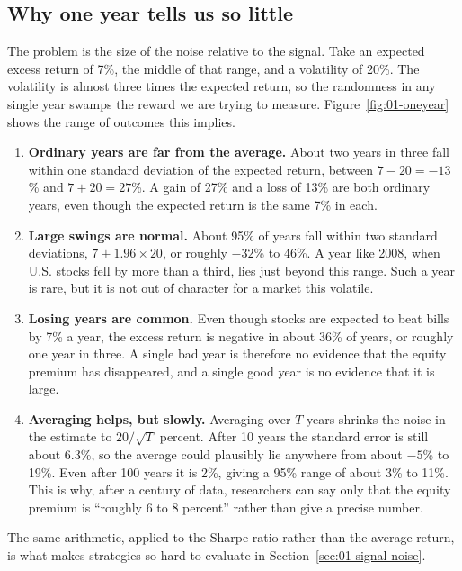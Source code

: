 \subsection{Why one year tells us so little}

The problem is the size of the noise relative to the signal. Take an expected excess return of 7\%, the middle of that range, and a volatility of 20\%. The volatility is almost three times the expected return, so the randomness in any single year swamps the reward we are trying to measure. Figure~\ref{fig:01-oneyear} shows the range of outcomes this implies.

\begin{enumerate}
  \item \textbf{Ordinary years are far from the average.} About two years in three fall within one standard deviation of the expected return, between $7 - 20 = -13$\% and $7 + 20 = 27$\%. A gain of 27\% and a loss of 13\% are both ordinary years, even though the expected return is the same 7\% in each.
  \item \textbf{Large swings are normal.} About 95\% of years fall within two standard deviations, $7 \pm 1.96 \times 20$, or roughly $-32$\% to 46\%. A year like 2008, when U.S. stocks fell by more than a third, lies just beyond this range. Such a year is rare, but it is not out of character for a market this volatile.
  \item \textbf{Losing years are common.} Even though stocks are expected to beat bills by 7\% a year, 
  the excess return is negative in about 36\% of years, or roughly one year in three. A single bad year is therefore no evidence that the equity premium has disappeared, and a single good year is no evidence that it is large.
  \item \textbf{Averaging helps, but slowly.} Averaging over $T$ years shrinks the noise in the estimate to $20/\sqrt{T}$ percent. After 10 years the standard error is still about 6.3\%, so the average could plausibly lie anywhere from about $-5$\% to 19\%. Even after 100 years it is 2\%, giving a 95\% range of about 3\% to 11\%. This is why, after a century of data, researchers can say only that the equity premium is ``roughly 6 to 8 percent'' rather than give a precise number.
\end{enumerate}

The same arithmetic, applied to the Sharpe ratio rather than the average return, is what makes strategies so hard to evaluate in Section~\ref{sec:01-signal-noise}.


